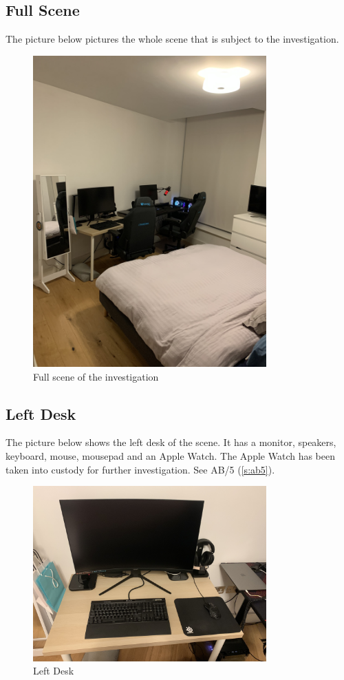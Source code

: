 \subsection{Full Scene}
\label{s:scene-full}
The picture below pictures the whole scene that is subject to the investigation.
\begin{figure}[h]
  \centering
  \includegraphics[width=0.8\textwidth, angle=-90,origin=c]{figures/pictures/IMG_5033.JPG}
  \caption{Full scene of the investigation}
  \label{fig:scene-full}
\end{figure}
\newpage

\subsection{Left Desk}
\label{s:left-desk}
The picture below shows the left desk of the scene. It has a monitor, speakers,
keyboard, mouse, mousepad and an Apple Watch. The Apple Watch has been taken
into custody for further investigation. See AB/5 (\ref{s:ab5}).
\begin{figure}[h]
  \centering
  \includegraphics[width=0.8\textwidth]{figures/pictures/IMG_5036.JPG}
  \caption{Left Desk}
  \label{fig:left-desk}
\end{figure}
\newpage

